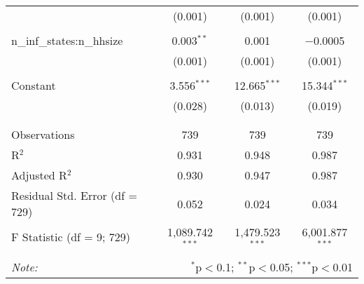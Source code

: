 \begin{table}[!htbp]
\begin{tabular}{@{\extracolsep{5pt}}lccc}
  & (0.001) & (0.001) & (0.001) \\ 
  & & & \\ 
 n\_inf\_states:n\_hhsize & 0.003$^{**}$ & 0.001 & $-$0.0005 \\ 
  & (0.001) & (0.001) & (0.001) \\ 
  & & & \\ 
 Constant & 3.556$^{***}$ & 12.665$^{***}$ & 15.344$^{***}$ \\ 
  & (0.028) & (0.013) & (0.019) \\ 
  & & & \\ 
\hline \\[-1.8ex] 
Observations & 739 & 739 & 739 \\ 
R$^{2}$ & 0.931 & 0.948 & 0.987 \\ 
Adjusted R$^{2}$ & 0.930 & 0.947 & 0.987 \\ 
Residual Std. Error (df = 729) & 0.052 & 0.024 & 0.034 \\ 
F Statistic (df = 9; 729) & 1,089.742$^{***}$ & 1,479.523$^{***}$ & 6,001.877$^{***}$ \\ 
\hline 
\hline \\[-1.8ex] 
\textit{Note:}  & \multicolumn{3}{r}{$^{*}$p$<$0.1; $^{**}$p$<$0.05; $^{***}$p$<$0.01} \\ 
\end{tabular} 
\end{table} 
